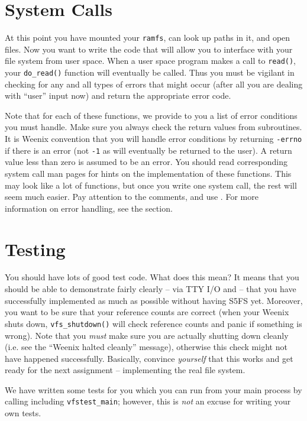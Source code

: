 \section{System Calls}

At this point you have mounted your \texttt{ramfs}, can look up paths in it, and open files. Now you want to write the code that will allow you to interface with your file system from user space. When a user space program makes a call to \texttt{read()}, your \texttt{do\_read()} function will eventually be called. Thus you must be vigilant in checking for any and all types of errors that might occur (after all you are dealing with ``user'' input now) and return the appropriate error code.

Note that for each of these functions, we provide to you a list of error
conditions you must handle.  Make sure you always check the return values from
subroutines. It is Weenix convention that you will handle error
conditions by returning \texttt{-errno} if there is an error (not \texttt{-1}
as will eventually be returned to the user). A return value less than zero is
assumed to be an error. You should read corresponding system call man pages for
hints on the implementation of these functions. This may look like a lot of
functions, but once you write one system call, the rest will seem much easier.
Pay attention to the comments, and use . For
more information on error handling, see the  section.

\section{Testing}

You should have lots of good test code. What does this mean? It means that you should be able to demonstrate fairly clearly -- via TTY I/O and  -- that you have successfully implemented as much as possible without having S5FS yet. Moreover, you want to be sure that your reference counts are correct (when your Weenix shuts down, \texttt{vfs\_shutdown()} will check reference counts and panic if something is wrong). Note that you \emph{must} make sure you are actually shutting down cleanly (i.e. see the ``Weenix halted cleanly'' message), otherwise this check might not have happened successfully. Basically, convince \emph{yourself} that this works and get ready for the next assignment -- implementing the real file system.

We have written some tests for you which you can run from your main process by
calling including \texttt{vfstest\_main}; however, this is \emph{not} an excuse for writing your own tests.

